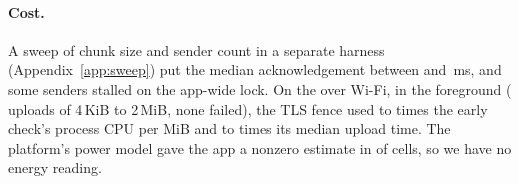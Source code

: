 \paragraph{Cost.} A sweep of chunk size and sender count in a separate harness (Appendix~\ref{app:sweep}) put
the median acknowledgement between \sweepAckLargeMs{} and \sweepAckSmallMs{}\,ms, and some senders stalled on the app-wide lock. On the \racePhoneModel{} over Wi-Fi, in the
foreground (\gdUploads{} uploads of 4\,KiB to 2\,MiB, none failed), the TLS fence used \gdCpuLo{} to \gdCpuHi{} times the
early check's process CPU per MiB and \gdTimeLo{} to \gdTimeHi{} times its median upload time. The platform's power model gave the app a nonzero estimate in \gdEnergyNonzero{} of
\gdEnergyCells{} cells, so we have no energy reading.
